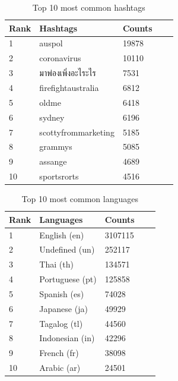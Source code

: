 \documentclass[11pt]{article}
\begin{document}
\begin{table}[h]
 \begin{center}
\begin{tabular}{|l|l|l|l|l|}

      \hline
      Rank &Hashtags & Counts   \\
      \hline\hline
      1 & auspol & 19878 \\
      2 & coronavirus & 10110 \\
      3 & มาพ่องเพิ่งอะไระไร & 7531 \\
      4 & firefightaustralia & 6812 \\
      5 & oldme & 6418 \\
      6 & sydney & 6196 \\
      7 & scottyfrommarketing & 5185\\
      8 & grammys & 5085 \\
      9 & assange & 4689 \\
      10 & sportsrorts & 4516 \\
    
     \hline

\end{tabular}
\caption{Top 10 most common hashtags}\label{table2}
 \end{center}
\end{table}


\begin{table}[h]
 \begin{center}
\begin{tabular}{|l|l|l|l|l|}

      \hline
      Rank &Languages & Counts   \\
      \hline\hline
      1 & English (en) & 3107115 \\
      2 & Undefined (un) & 252117 \\
      3 & Thai (th) & 134571 \\
      4 & Portuguese (pt) & 125858 \\
      5 & Spanish (es) & 74028 \\
      6 & Japanese (ja) & 49929 \\
      7 & Tagalog (tl) & 44560\\
      8 & Indonesian (in) & 42296 \\
      9 & French (fr) & 38098 \\
      10 & Arabic (ar) & 24501 \\
    
     \hline

\end{tabular}
\caption{Top 10 most common languages}\label{table3}
 \end{center}
\end{table}
\end{document}
